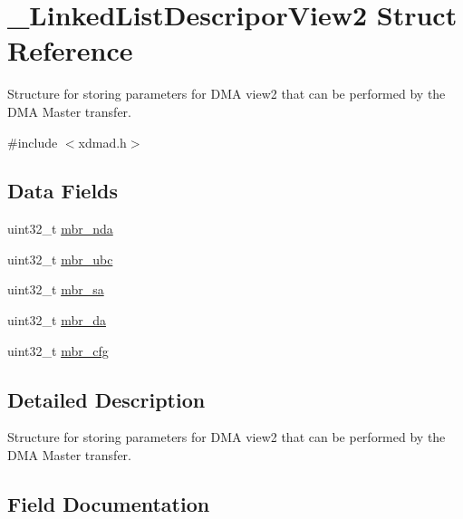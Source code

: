 \hypertarget{struct__LinkedListDescriporView2}{}\section{\+\_\+\+Linked\+List\+Descripor\+View2 Struct Reference}
\label{struct__LinkedListDescriporView2}


Structure for storing parameters for D\+MA view2 that can be performed by the D\+MA Master transfer.  




{\ttfamily \#include $<$xdmad.\+h$>$}

\subsection*{Data Fields}
\begin{DoxyCompactItemize}
\item 
uint32\+\_\+t \mbox{\hyperlink{struct__LinkedListDescriporView2_ab2d82724ca8bb20989c1b8b2d81152e1}{mbr\+\_\+nda}}
\item 
uint32\+\_\+t \mbox{\hyperlink{struct__LinkedListDescriporView2_aa169c376043fa30a8c9b233aea46ef59}{mbr\+\_\+ubc}}
\item 
uint32\+\_\+t \mbox{\hyperlink{struct__LinkedListDescriporView2_a9726f0fdb277f9d54875a9666980a1f5}{mbr\+\_\+sa}}
\item 
uint32\+\_\+t \mbox{\hyperlink{struct__LinkedListDescriporView2_a56c310f36caadf3328755717aeb96af8}{mbr\+\_\+da}}
\item 
uint32\+\_\+t \mbox{\hyperlink{struct__LinkedListDescriporView2_a86eb31406767cff6b28296a3d9694fb8}{mbr\+\_\+cfg}}
\end{DoxyCompactItemize}


\subsection{Detailed Description}
Structure for storing parameters for D\+MA view2 that can be performed by the D\+MA Master transfer. 

\subsection{Field Documentation}
\mbox{\label{struct__LinkedListDescriporView2_a86eb31406767cff6b28296a3d9694fb8}} 
